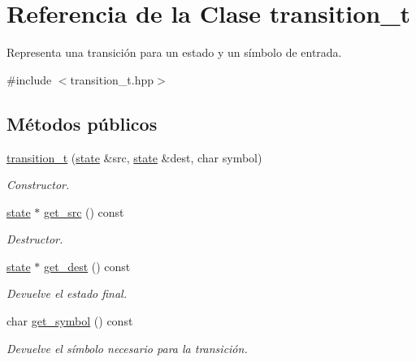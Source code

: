 \hypertarget{classtransition__t}{}\section{Referencia de la Clase transition\+\_\+t}
\label{classtransition__t}


Representa una transición para un estado y un símbolo de entrada.  




{\ttfamily \#include $<$transition\+\_\+t.\+hpp$>$}

\subsection*{Métodos públicos}
\begin{DoxyCompactItemize}
\item 
\hypertarget{classtransition__t_a04ff8486138f334115c79cdfb4e72a78}{}\hyperlink{classtransition__t_a04ff8486138f334115c79cdfb4e72a78}{transition\+\_\+t} (\hyperlink{classstate}{state} \&src, \hyperlink{classstate}{state} \&dest, char symbol)\label{classtransition__t_a04ff8486138f334115c79cdfb4e72a78}

\begin{DoxyCompactList}\small\item\em Constructor. \end{DoxyCompactList}\item 
\hyperlink{classstate}{state} $\ast$ \hyperlink{classtransition__t_aac5048fbc4307cc982437e393cf97c89}{get\+\_\+src} () const 
\begin{DoxyCompactList}\small\item\em Destructor. \end{DoxyCompactList}\item 
\hyperlink{classstate}{state} $\ast$ \hyperlink{classtransition__t_a91eb01ea36496fd40b84f5f68b598ca6}{get\+\_\+dest} () const 
\begin{DoxyCompactList}\small\item\em Devuelve el estado final. \end{DoxyCompactList}\item 
char \hyperlink{classtransition__t_a30f07640593000fa0994a852f803f8b6}{get\+\_\+symbol} () const 
\begin{DoxyCompactList}\small\item\em Devuelve el símbolo necesario para la transición. \end{DoxyCompactList}\end{DoxyCompactItemize}
